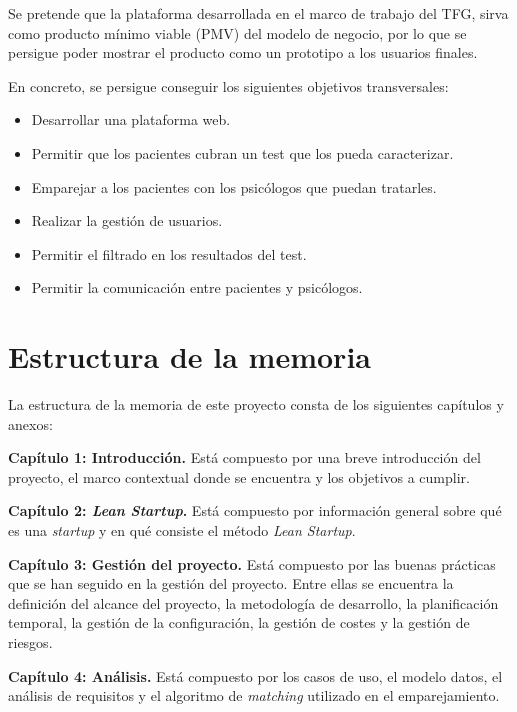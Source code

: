 Se pretende que la plataforma desarrollada en el marco de trabajo del TFG, sirva como producto mínimo viable (PMV) del modelo de negocio, por lo que se persigue poder mostrar el producto como un prototipo a los usuarios finales. 


En concreto, se persigue conseguir los siguientes objetivos transversales:


\begin{itemize}
\item Desarrollar una plataforma web.
\item Permitir que los pacientes cubran un test que los pueda caracterizar.
\item Emparejar a los pacientes con los psicólogos que puedan tratarles.
\item Realizar la gestión de usuarios.
\item Permitir el filtrado en los resultados del test.
\item Permitir la comunicación entre pacientes y psicólogos.
\end{itemize}


\section{Estructura de la memoria}
La estructura de la memoria de este proyecto consta de los siguientes capítulos y anexos:\newline


\textbf{Capítulo 1: Introducción.} Está compuesto por una breve introducción del proyecto, el marco contextual donde se encuentra y los objetivos a cumplir.\newline


\textbf{Capítulo 2: \textit{Lean Startup}.} Está compuesto por información general sobre qué es una \textit{startup} y en qué consiste el método \textit{Lean Startup}.\newline


\textbf{Capítulo 3: Gestión del proyecto.} Está compuesto por las buenas prácticas que se han seguido en la gestión del proyecto. Entre ellas se encuentra la definición del alcance del proyecto, la metodología de desarrollo, la planificación temporal, la gestión de la configuración, la gestión de costes y la gestión de riesgos.\newline


\textbf{Capítulo 4: Análisis.} Está compuesto por los casos de uso, el modelo datos, el análisis de requisitos y el algoritmo de \textit{matching} utilizado en el emparejamiento.\newline


